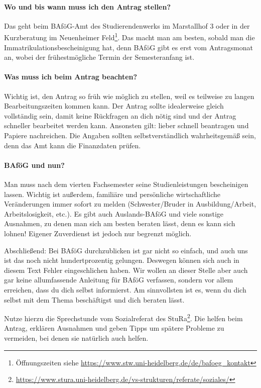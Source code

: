 \vspace{-2mm}
\paragraph{Wo und bis wann muss ich den Antrag stellen?}
Das geht beim BAföG-Amt des Studierendenwerks im Marstallhof 3 oder in der Kurzberatung im Neuenheimer Feld\footnote{Öffnungszeiten siehe \url{https://www.stw.uni-heidelberg.de/de/bafoeg_kontakt}}. Das macht man am besten, sobald man die Immatrikulationsbescheinigung hat, denn BAföG gibt es erst vom Antragsmonat an, wobei der frühestmögliche Termin der Semesteranfang ist.

\vspace{-2mm}
\paragraph{Was muss ich beim Antrag beachten?}
Wichtig ist, den Antrag so früh wie möglich zu stellen, weil es teilweise zu langen Bearbeitungszeiten kommen kann. Der Antrag sollte idealerweise gleich vollständig sein, damit keine Rückfragen an dich nötig sind und der Antrag schneller bearbeitet werden kann. Ansonsten gilt: lieber schnell beantragen und Papiere nachreichen. Die Angaben sollten selbstverständlich wahrheitsgemäß sein, denn das Amt kann die Finanzdaten prüfen.

\vspace{-2mm}
\paragraph{BAföG und nun?}
Man muss nach dem vierten Fachsemester seine Studienleistungen bescheinigen lassen. Wichtig ist außerdem,  familiäre und persönliche wirtschaftliche Veränderungen immer sofort zu melden (Schwester/Bruder in Ausbildung/Arbeit, Arbeitslosigkeit, etc.). Es gibt auch Auslands-BAföG und viele sonstige Ausnahmen, zu denen man sich am besten beraten lässt, denn es kann sich lohnen! Eigener Zuverdienst ist jedoch nur begrenzt möglich.

\noindent Abschließend: Bei BAföG durchzublicken ist gar nicht so einfach, und auch uns ist das noch nicht hundertprozentig gelungen. Deswegen können sich auch in diesem Text Fehler eingeschlichen haben. Wir wollen an dieser Stelle aber auch gar keine allumfassende Anleitung für BAföG verfassen, sondern vor allem erreichen, dass du dich selbst informierst. Am sinnvollsten ist es, wenn du dich selbst mit dem Thema beschäftigst und dich beraten lässt.

Nutze hierzu die Sprechstunde vom Sozialreferat des \gls{StuRa}\footnote{\url{https://www.stura.uni-heidelberg.de/vs-strukturen/referate/soziales/}}. Die helfen beim Antrag, erklären Ausnahmen und geben Tipps um spätere Probleme zu vermeiden, bei denen sie natürlich auch helfen.
